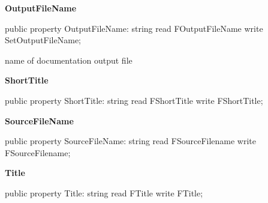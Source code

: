 \documentclass{report}
\newif\ifpdf
\begin{document}
\begin{list}{}{
\setlength{\itemindent}{0cm}
\setlength{\listparindent}{0cm}
\setlength{\leftmargin}{\evensidemargin}
\addtolength{\leftmargin}{\tmplength}
\settowidth{\labelsep}{X}
\addtolength{\leftmargin}{\labelsep}
\setlength{\labelwidth}{\tmplength}
}
\label{PasDoc_Items.TExternalItem-OutputFileName}
\item[\textbf{OutputFileName}\hfill]
\ifpdf
\begin{flushleft}
\fi
\begin{ttfamily}
public property OutputFileName: string read FOutputFileName write SetOutputFileName;\end{ttfamily}

\ifpdf
\end{flushleft}
\fi


\par name of documentation output file\label{PasDoc_Items.TExternalItem-ShortTitle}
\item[\textbf{ShortTitle}\hfill]
\ifpdf
\begin{flushleft}
\fi
\begin{ttfamily}
public property ShortTitle: string read FShortTitle write FShortTitle;\end{ttfamily}

\ifpdf
\end{flushleft}
\fi


\par  \label{PasDoc_Items.TExternalItem-SourceFileName}
\item[\textbf{SourceFileName}\hfill]
\ifpdf
\begin{flushleft}
\fi
\begin{ttfamily}
public property SourceFileName: string read FSourceFilename write FSourceFilename;\end{ttfamily}

\ifpdf
\end{flushleft}
\fi


\par  \label{PasDoc_Items.TExternalItem-Title}
\item[\textbf{Title}\hfill]
\ifpdf
\begin{flushleft}
\fi
\begin{ttfamily}
public property Title: string read FTitle write FTitle;\end{ttfamily}

\ifpdf
\end{flushleft}
\fi



\end{list}
\end{document}
